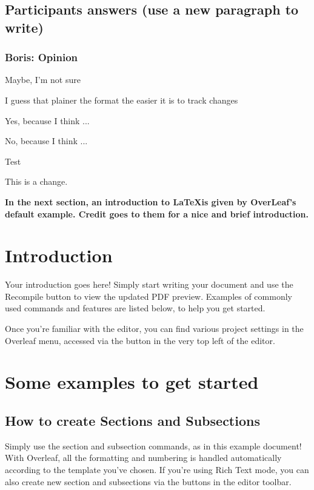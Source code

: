 \documentclass{article}
\begin{document}
\subsection{Participants answers (use a new paragraph to write)}

\subsubsection{Boris: Opinion}

Maybe, I'm not sure


I guess that plainer the format the easier it is to track changes

Yes, because I think ...

No, because I think ...

Test 

This is a change.

\textbf{In the next section, an introduction to \LaTeX  is given by OverLeaf's default example. Credit goes to them for a nice and brief introduction.}

\section{Introduction}

Your introduction goes here! Simply start writing your document and use the Recompile button to view the updated PDF preview. Examples of commonly used commands and features are listed below, to help you get started.

Once you're familiar with the editor, you can find various project settings in the Overleaf menu, accessed via the button in the very top left of the editor.

\section{Some examples to get started}

\subsection{How to create Sections and Subsections}

Simply use the section and subsection commands, as in this example document! With Overleaf, all the formatting and numbering is handled automatically according to the template you've chosen. If you're using Rich Text mode, you can also create new section and subsections via the buttons in the editor toolbar.
\end{document}
